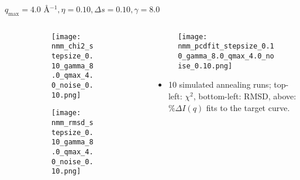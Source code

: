 \documentclass{beamer}
\begin{document}
\begin{frame}{$ q_{\textrm{max}}=4.0 $ \AA $^{-1}, \eta=0.10, \Delta s=0.10, \gamma=8.0$}
	\begin{columns}
		\begin{column}{.5\textwidth}
			\begin{figure}[H]
			\centering
			\begin{subfigure}[b]{\textwidth}
				\centering
				\texttt{[image: nmm\_chi2\_stepsize\_0.10\_gamma\_8.0\_qmax\_4.0\_noise\_0.10.png]}
				\label{fig:}
			\end{subfigure}
			\begin{subfigure}[b]{\textwidth}
				\centering
				\texttt{[image: nmm\_rmsd\_stepsize\_0.10\_gamma\_8.0\_qmax\_4.0\_noise\_0.10.png]}
				\label{fig:}
			\end{subfigure}
			\end{figure}
		\end{column}
		\begin{column}{.5\textwidth}
			\begin{figure}[H]
				\centering
				\texttt{[image: nmm\_pcdfit\_stepsize\_0.10\_gamma\_8.0\_qmax\_4.0\_noise\_0.10.png]}
				\label{fig:}
			\end{figure}
			\begin{itemize}
				\item 10 simulated annealing runs; top-left: $\chi^2$, bottom-left: RMSD, above: $\%\Delta I(q)$ fits to the target curve.
			\end{itemize}
		\end{column}
	\end{columns}
\end{frame}
 
\end{document}

